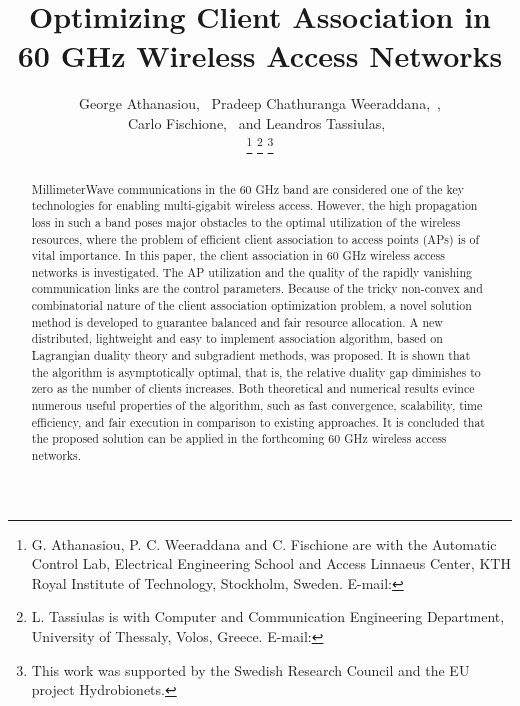 \documentclass[journal, 10pt, twocolumn]{IEEEtran}
\begin{document}
\title{Optimizing Client Association in \\60 GHz Wireless Access Networks}
\author{
        George Athanasiou,~
        Pradeep Chathuranga Weeraddana,~,
        \\Carlo Fischione,~
        and Leandros Tassiulas,~

\thanks{G. Athanasiou, P. C. Weeraddana and C. Fischione are with the Automatic Control Lab, Electrical Engineering School and Access Linnaeus Center, KTH Royal Institute of Technology, Stockholm, Sweden. E-mail: }
\thanks{L. Tassiulas is with Computer and Communication Engineering Department, University of Thessaly, Volos, Greece. E-mail: }
\thanks{This work was supported by the Swedish Research Council and the EU project Hydrobionets.}}























\maketitle


\begin{abstract}
MillimeterWave communications in the 60 GHz band are considered one of the key technologies for enabling multi-gigabit wireless access. However, the high propagation loss in such a band poses major obstacles to the optimal utilization of the wireless resources, where the problem of efficient client association to access points (APs) is of vital importance. In this paper, the client association in 60 GHz wireless access networks is investigated. The AP utilization and the quality of the rapidly vanishing communication links are the control parameters. Because of the tricky non-convex and combinatorial nature of the client association optimization problem, a novel solution method is developed to guarantee balanced and fair resource allocation. A new distributed, lightweight and easy to implement association algorithm, based on Lagrangian duality theory and subgradient methods, was proposed. It is shown that the algorithm is asymptotically optimal, that is, the relative duality gap diminishes to zero as the number of clients increases. Both theoretical and numerical results evince numerous useful properties of the algorithm, such as fast convergence, scalability, time efficiency, and fair execution in comparison to existing approaches. It is concluded that the proposed solution can be applied in the forthcoming 60 GHz wireless access networks.
\end{abstract}
\end{document}
